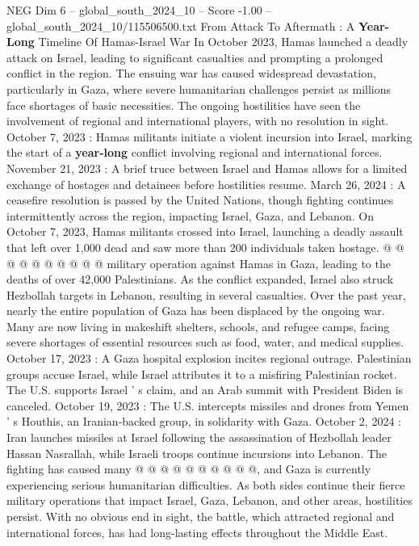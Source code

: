 \begin{textsample}{NEG Dim 6 – global\_south\_2024\_10 – Score -1.00 – global\_south\_2024\_10/115506500.txt}  \label{ex:f6_neg_054}
From Attack To Aftermath : A \textbf{Year-Long} Timeline Of Hamas-Israel War In October 2023, Hamas launched a deadly attack on Israel, leading to significant casualties and prompting a prolonged conflict in the region.
The ensuing war has caused widespread devastation, particularly in Gaza, where severe humanitarian challenges persist as millions face shortages of basic necessities.
The ongoing hostilities have seen the involvement of regional and international players, with no resolution in sight.
October 7, 2023 : Hamas militants initiate a violent incursion into Israel, marking the start of a \textbf{year-long} conflict involving regional and international forces.
November 21, 2023 : A brief truce between Israel and Hamas allows for a limited exchange of hostages and detainees before hostilities resume.
March 26, 2024 : A ceasefire resolution is passed by the United Nations, though fighting continues intermittently across the region, impacting Israel, Gaza, and Lebanon.
On October 7, 2023, Hamas militants crossed into Israel, launching a deadly assault that left over 1,000 dead and saw more than 200 individuals taken hostage. @ @ @ @ @ @ @ @ @ @ military operation against Hamas in Gaza, leading to the deaths of over 42,000 Palestinians.
As the conflict expanded, Israel also struck Hezbollah targets in Lebanon, resulting in several casualties.
Over the past year, nearly the entire population of Gaza has been displaced by the ongoing war.
Many are now living in makeshift shelters, schools, and refugee camps, facing severe shortages of essential resources such as food, water, and medical supplies.
October 17, 2023 : A Gaza hospital explosion incites regional outrage.
Palestinian groups accuse Israel, while Israel attributes it to a misfiring Palestinian rocket.
The U.S. supports Israel ' s claim, and an Arab summit with President Biden is canceled.
October 19, 2023 : The U.S. intercepts missiles and drones from Yemen ' s Houthis, an Iranian-backed group, in solidarity with Gaza.
October 2, 2024 : Iran launches missiles at Israel following the assassination of Hezbollah leader Hassan Nasrallah, while Israeli troops continue incursions into Lebanon.
The fighting has caused many @ @ @ @ @ @ @ @ @ @, and Gaza is currently experiencing serious humanitarian difficulties.
As both sides continue their fierce military operations that impact Israel, Gaza, Lebanon, and other areas, hostilities persist.
With no obvious end in sight, the battle, which attracted regional and international forces, has had long-lasting effects throughout the Middle East.

\end{textsample}
